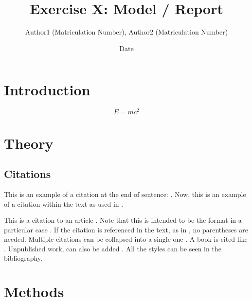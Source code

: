 \documentclass{Resources/netsci-project}
\begin{document}

\title{Exercise X: Model / Report}
\author{Author1 (Matriculation Number), Author2 (Matriculation Number)}
\date{Date}

\maketitle

\begin{abstract}
\lipsum[1] %
\end{abstract}


\section{Introduction}
\lipsum[2]
\begin{equation} \label{eqRestMass}
E = mc^2
\end{equation}
\lipsum[3]

\section{Theory}
\lipsum[4]

\subsection{Citations}


This is an example of a citation at the end of sentence: \autocite{testcite}.
Now, this is an example of a citation within the text as used in \textcite{testcite}.

This is a citation to an article \parencite{testcite}. Note that this is intended to be the format in a particular case \parencite{boccalettia06}. If the citation is referenced in the text, as in \cite{Arenas2008}, no parentheses are needed. Multiple  citations can be collapsed into a single one \parencite{Dijkstra1974,ms09,g09}. A book is cited like \cite{wad}. Unpublished work, can also be added \parencite{zanettiicse2012}. All the styles can be seen in the bibliography.

\section{Methods}
\end{document}

